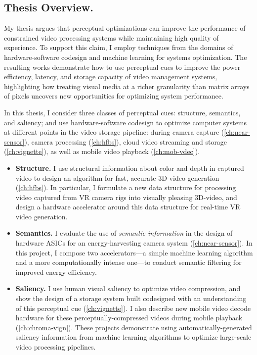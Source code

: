 \subsection{Thesis Overview.} My thesis argues that perceptual optimizations can improve the performance of constrained video processing systems while maintaining high quality of experience.
To support this claim, I employ techniques from the domains of hardware-software codesign and machine learning for systems optimization.
The resulting works demonstrate how to use perceptual cues to improve the power efficiency, latency, and storage capacity of video management systems, highlighting how treating visual media at a richer granularity than matrix arrays of pixels uncovers new opportunities for optimizing system performance.

In this thesis, I consider three classes of perceptual cues: structure, semantics, and saliency; and use hardware-software codesign to optimize computer systems at different points in the video storage pipeline: during camera capture (\ref{ch:near-sensor}), camera processing (\ref{ch:hfbs}), cloud video streaming and storage (\ref{ch:vignette}), as well as mobile video playback (\ref{ch:mob-vdec}).

\begin{itemize}
\item \textbf{Structure.} I use structural information about color and depth in captured video to design an algorithm for fast, accurate 3D-\threesixty video generation (\ref{ch:hfbs}).
In particular, I formulate a new data structure for processing video captured from VR camera rigs into visually pleasing 3D-\threesixty video, and design a hardware accelerator around this data structure for real-time VR video generation.

\item \textbf{Semantics.} I evaluate the use of \emph{semantic information} in the design of hardware ASICs for an energy-harvesting camera system (\ref{ch:near-sensor}).
In this project, I compose two accelerators---a simple machine learning algorithm and a more computationally intense one---to conduct semantic filtering for improved energy efficiency.

\item \textbf{Saliency.} I use human visual saliency to optimize video compression, and show the design of a storage system built codesigned with an understanding of this perceptual cue (\ref{ch:vignette}).
I also describe new mobile video decode hardware for these perceptually-compressed videos during mobile playback (\ref{ch:chroma-vign}).
These projects demonstrate using automatically-generated saliency information from machine learning algorithms to optimize large-scale video processing pipelines.
\end{itemize}

